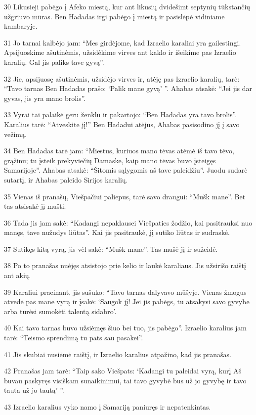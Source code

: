 \par 30 Likusieji pabėgo į Afeko miestą, kur ant likusių dvidešimt septynių tūkstančių užgriuvo mūras. Ben Hadadas irgi pabėgo į miestą ir pasislėpė vidiniame kambaryje. 
\par 31 Jo tarnai kalbėjo jam: “Mes girdėjome, kad Izraelio karaliai yra gailestingi. Apsijuoskime ašutinėmis, užsidėkime virves ant kaklo ir išeikime pas Izraelio karalių. Gal jis paliks tave gyvą”. 
\par 32 Jie, apsijuosę ašutinėmis, užsidėjo virves ir, atėję pas Izraelio karalių, tarė: “Tavo tarnas Ben Hadadas prašo: ‘Palik mane gyvą’ ”. Ahabas atsakė: “Jei jis dar gyvas, jis yra mano brolis”. 
\par 33 Vyrai tai palaikė geru ženklu ir pakartojo: “Ben Hadadas yra tavo brolis”. Karalius tarė: “Atveskite jį!” Ben Hadadui atėjus, Ahabas pasisodino jį į savo vežimą. 
\par 34 Ben Hadadas tarė jam: “Miestus, kuriuos mano tėvas atėmė iš tavo tėvo, grąžinu; tu įsteik prekyviečių Damaske, kaip mano tėvas buvo įsteigęs Samarijoje”. Ahabas atsakė: “Šitomis sąlygomis aš tave paleidžiu”. Juodu sudarė sutartį, ir Ahabas paleido Sirijos karalių. 
\par 35 Vienas iš pranašų, Viešpačiui paliepus, tarė savo draugui: “Mušk mane”. Bet tas atsisakė jį mušti. 
\par 36 Tada jis jam sakė: “Kadangi nepaklausei Viešpaties žodžio, kai pasitrauksi nuo manęs, tave nužudys liūtas”. Kai jis pasitraukė, jį sutiko liūtas ir sudraskė. 
\par 37 Sutikęs kitą vyrą, jis vėl sakė: “Mušk mane”. Tas mušė jį ir sužeidė. 
\par 38 Po to pranašas nuėjęs atsistojo prie kelio ir laukė karaliaus. Jis užsirišo raištį ant akių. 
\par 39 Karaliui praeinant, jis sušuko: “Tavo tarnas dalyvavo mūšyje. Vienas žmogus atvedė pas mane vyrą ir įsakė: ‘Saugok jį! Jei jis pabėgs, tu atsakysi savo gyvybe arba turėsi sumokėti talentą sidabro’. 
\par 40 Kai tavo tarnas buvo užsiėmęs šiuo bei tuo, jis pabėgo”. Izraelio karalius jam tarė: “Teismo sprendimą tu pats sau pasakei”. 
\par 41 Jis skubiai nusiėmė raištį, ir Izraelio karalius atpažino, kad jis pranašas. 
\par 42 Pranašas jam tarė: “Taip sako Viešpats: ‘Kadangi tu paleidai vyrą, kurį Aš buvau paskyręs visiškam sunaikinimui, tai tavo gyvybė bus už jo gyvybę ir tavo tauta už jo tautą’ ”. 
\par 43 Izraelio karalius vyko namo į Samariją paniuręs ir nepatenkintas.



